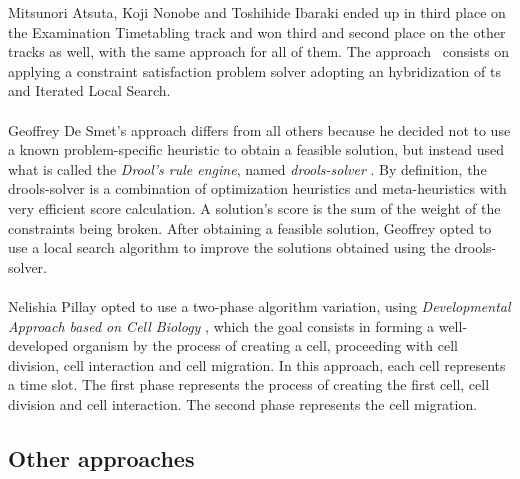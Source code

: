 Mitsunori Atsuta, Koji Nonobe and Toshihide Ibaraki ended up in third place on the Examination Timetabling track and won third and second place on the other tracks as well, with the same approach for all of them. The approach~\cite{Atsuta2007} consists on applying a constraint satisfaction problem solver adopting an hybridization of \gls{ts} and Iterated Local Search.\\
\\
Geoffrey De Smet's approach \cite{Smet2007} differs from all others because he decided not to use a known problem-specific heuristic to obtain a feasible solution, but instead used what is called the \textit{Drool's rule engine}, named \textit{drools-solver} \cite{Drools}. By definition, the drools-solver is a combination of optimization heuristics and meta-heuristics with very efficient score calculation. A solution's score is the sum of the weight of the constraints being broken. After obtaining a feasible solution, Geoffrey opted to use a local search algorithm to improve the solutions obtained using the drools-solver.\\
\\
Nelishia Pillay opted to use a two-phase algorithm variation, using \textit{Developmental Approach based on Cell Biology} \cite{Pillay2007}, which the goal consists in forming a well-developed organism by the process of creating a cell, proceeding with cell division, cell interaction and cell migration. In this approach, each cell represents a time slot. The first phase represents the process of creating the first cell, cell division and cell interaction. The second phase represents the cell migration.

\subsection{Other approaches}
\label{subsection:OtherAppr}

